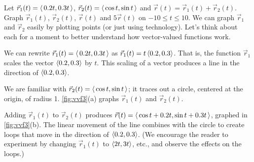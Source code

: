\begin{example}\label{ex_vvf3}%
Let $\vec r_1(t) =\left\langle \,0.2t,0.3t\,\right\rangle$, $\vec r_2(t) =\left\langle \,\cos t,\sin t\,\right\rangle$ and $\vec r(t) = \vec r_1(t)+\vec r_2(t)$. Graph $\vec r_1(t)$, $\vec r_2(t)$, $\vec r(t)$ and $5\vec r(t)$ on $-10\leq t\leq10$.
\solution
We can graph $\vec r_1$ and $\vec r_2$ easily by plotting points (or just using technology). Let's think about each for a moment to better understand how vector-valued functions work.

We can rewrite $\vec r_1(t) =\left\langle \, 0.2t,0.3t\,\right\rangle$ as $ \vec r_1(t) = t\left\langle 0.2,0.3\right\rangle$. That is, the function $\vec r_1$ scales the vector $\left\langle 0.2,0.3\right\rangle$ by $t$. This scaling of a vector produces a line in the direction of $\left\langle 0.2,0.3\right\rangle$.

We are familiar with $\vec r_2(t) =\left\langle \, \cos t,\sin t\,\right\rangle$; it traces out a circle, centered at the origin, of radius 1. \autoref{fig:vvf3}(a) graphs $\vec r_1(t)$ and $\vec r_2(t)$.

Adding $\vec r_1(t)$ to $\vec r_2(t)$ produces $\vec r(t) =\left\langle \,\cos t + 0.2t,\sin t+0.3t\,\right\rangle$, graphed in \autoref{fig:vvf3}(b). The linear movement of the line combines with the circle to create loops that move in the direction of $\left\langle 0.2,0.3\right\rangle$.  (We encourage the reader to experiment by changing $\vec r_1(t)$ to $\left\langle 2t,3t\right\rangle$, etc., and observe the effects on the loops.)


\end{example}

